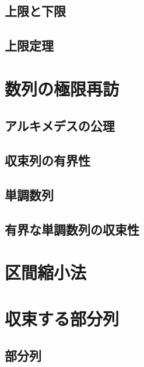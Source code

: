 \documentclass[../math-imaging]{subfiles}
\begin{document}
\subsection{上限と下限}

\subsection{上限定理}


\section{数列の極限再訪}

\subsection{アルキメデスの公理}


\subsection{収束列の有界性}


\subsection{単調数列}


\subsection{有界な単調数列の収束性}


\section{区間縮小法}


\section{収束する部分列}

\subsection{部分列}
\end{document}
